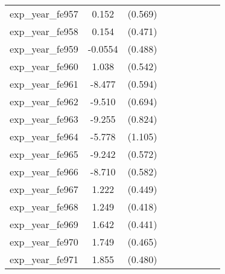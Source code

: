 {\begin{tabular}{l*{4}{cc}}
exp\_year\_fe957&    0.152         &  (0.569)&                  &         &                  &         &                  &         \\
exp\_year\_fe958&    0.154         &  (0.471)&                  &         &                  &         &                  &         \\
exp\_year\_fe959&  -0.0554         &  (0.488)&                  &         &                  &         &                  &         \\
exp\_year\_fe960&    1.038         &  (0.542)&                  &         &                  &         &                  &         \\
exp\_year\_fe961&   -8.477\sym{***}&  (0.594)&                  &         &                  &         &                  &         \\
exp\_year\_fe962&   -9.510\sym{***}&  (0.694)&                  &         &                  &         &                  &         \\
exp\_year\_fe963&   -9.255\sym{***}&  (0.824)&                  &         &                  &         &                  &         \\
exp\_year\_fe964&   -5.778\sym{***}&  (1.105)&                  &         &                  &         &                  &         \\
exp\_year\_fe965&   -9.242\sym{***}&  (0.572)&                  &         &                  &         &                  &         \\
exp\_year\_fe966&   -8.710\sym{***}&  (0.582)&                  &         &                  &         &                  &         \\
exp\_year\_fe967&    1.222\sym{**} &  (0.449)&                  &         &                  &         &                  &         \\
exp\_year\_fe968&    1.249\sym{**} &  (0.418)&                  &         &                  &         &                  &         \\
exp\_year\_fe969&    1.642\sym{***}&  (0.441)&                  &         &                  &         &                  &         \\
exp\_year\_fe970&    1.749\sym{***}&  (0.465)&                  &         &                  &         &                  &         \\
exp\_year\_fe971&    1.855\sym{***}&  (0.480)&                  &         &                  &         &                  &         \\

\end{tabular}}
